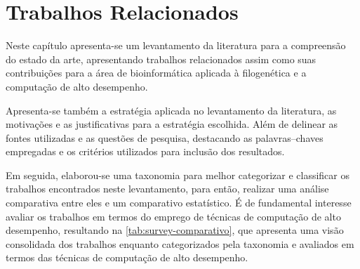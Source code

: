 \documentclass[english,brazilian]{UNISINOSmonografia} %
\begin{document}
\chapter{Trabalhos Relacionados}
\label{ch:relacionados}







Neste capítulo apresenta-se um levantamento da literatura para a compreensão do estado da arte, apresentando trabalhos relacionados assim como suas contribuições para a área de bioinformática aplicada à filogenética e a computação de alto desempenho.


Apresenta-se também a estratégia aplicada no levantamento da literatura, as motivações e as justificativas para a estratégia escolhida. Além de delinear as fontes utilizadas e as questões de pesquisa, destacando as palavras--chaves empregadas e os critérios utilizados para inclusão dos resultados.


Em seguida, elaborou-se uma taxonomia para melhor categorizar e classificar os trabalhos encontrados neste levantamento, para então, realizar uma análise comparativa entre eles e um comparativo estatístico. É de fundamental interesse avaliar os trabalhos em termos do emprego de técnicas de computação de alto desempenho, resultando na \autoref{tab:survey-comparativo}, que apresenta uma visão consolidada dos trabalhos enquanto categorizados pela taxonomia e avaliados em termos das técnicas de computação de alto desempenho.
\end{document}
